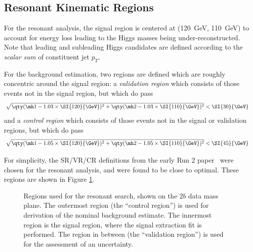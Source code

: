 \subsection{Resonant Kinematic Regions}
For the resonant analysis, the signal region is centered at (\SI{120}{\GeV}, \SI{110}{\GeV}) 
to account for energy loss leading to the Higgs masses being under-reconstructed. Note that leading and 
subleading Higgs candidates are defined according to the 
\emph{scalar sum} of constituent jet $p_{T}$.

For the background estimation, two regions are defined which are roughly concentric around the 
signal region: a \emph{validation region} which 
consists of those events not in the signal region, but which do pass
\begin{equation}
	\label{eqn:val-reg-def}
	\sqrt{\qty(\mh1 - 1.03 \times \SI{120}{\GeV})^{2} + \qty(\mh2 - 1.03 \times
		\SI{110}{\GeV})^{2}} < \SI{30}{\GeV}
\end{equation}
and a \emph{control region} which consists of those events not in the signal or validation
regions, but which do pass
\begin{equation}
	\label{eqn:ctrl-reg-def}
	\sqrt{\qty(\mh1 - 1.05 \times \SI{120}{\GeV})^{2} + \qty(\mh2 - 1.05 \times
		\SI{110}{\GeV})^{2}} < \SI{45}{\GeV}
\end{equation}

For simplicity, the SR/VR/CR definitions from the early Run 2 paper~\cite{EXOT-2016-31} were chosen 
for the resonant analysis, and were found to be close to optimal. These regions are shown in Figure 
\ref{fig:res-regions}.

\begin{figure}
\centering
{}
\caption{\label{fig:res-regions} Regions used for the resonant search, shown on the $2b$ data  
mass plane. The outermost region (the ``control region'') is used for derivation of the nominal 
background estimate. The innermost region is the signal region, where the signal extraction 
fit is performed. The region in between (the ``validation region'') is used for the assessment of an 
uncertainty.}
\end{figure}

